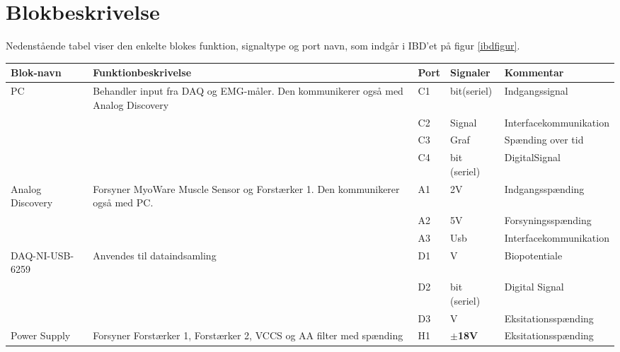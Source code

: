 \section{Blokbeskrivelse} \label{blokbesk}
Nedenstående tabel viser den enkelte blokes funktion, signaltype og port navn, som indgår i IBD'et på figur \ref{ibdfigur}.

\begin{table} [H]
  \centering

\begin{tabular}  {|p{3cm}|p{4cm}|p{1cm}|p{1.5cm}|p{3.8cm}| }

\hline
	
	\textbf{Blok-navn} & \textbf{Funktionbeskrivelse}  & \textbf{Port} & \textbf{Signaler} & \textbf{Kommentar} \\ \cline{3-5} \hline
	PC & Behandler input fra DAQ og EMG-måler.  Den kommunikerer også med Analog Discovery &  C1 & bit(seriel) & Indgangssignal  \\ \cline{3-5}
	 &  & C2 & Signal & Interfacekommunikation \\ \cline{3-5} 
	 &  & C3 & Graf & Spænding over tid \\ \cline{3-5} 
	 &  & C4 & bit (seriel) & DigitalSignal \\ \cline{3-5} 
	 
	 \hline
	 
	 
Analog Discovery  & Forsyner MyoWare Muscle Sensor og Forstærker 1. Den kommunikerer også med PC.  &  A1 & 2V & Indgangsspænding    \\ \cline{3-5}
	 &  & A2 & 5V & Forsyningsspænding \\ \cline{3-5}
	 &  & A3 & Usb  & Interfacekommunikation  \\ \hline
	 
	 
	  
	 
	 
	 
DAQ-NI-USB-6259  & Anvendes til dataindsamling  &  D1 & V & Biopotentiale   \\ \cline{3-5}
	 &  & D2 & bit (seriel) & Digital Signal \\ \cline{3-5}
	 &  & D3 & V  & Eksitationsspænding   \\ \hline
	
  
	
	
	 
Power Supply  & Forsyner Forstærker 1, Forstærker 2, VCCS og AA filter med spænding  &  H1 & $ \pm  $\textbf{18V} &  Eksitationsspænding \\ \hline

  


\end{tabular}
\end{table}
